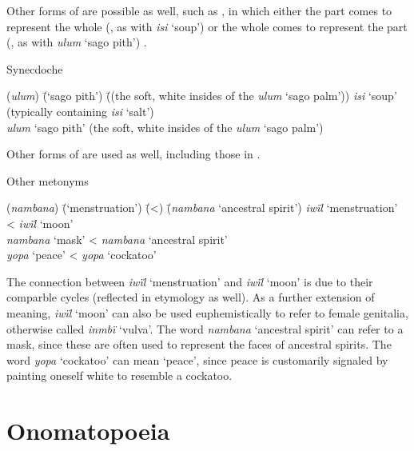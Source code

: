 Other forms of  are possible as well, such as , in which either the part comes to represent the whole (, as with \textit{isi} ‘soup’) or the whole comes to represent the part (, as with \textit{ulum} ‘sago pith’) .

\ea%
    \label{ex:sem:8}
            Synecdoche
\begin{tabbing}
{(\textit{ulum})} \= {(‘sago pith’)} \= {((the soft, white insides of the \textit{ulum} ‘sago palm’))}\kill
{\textit{isi}} \> {‘soup’} \> {(typically containing \textit{isi} ‘salt’)}\\
{\textit{ulum}} \> {‘sago pith’} \> {(the soft, white insides of the \textit{ulum} ‘sago palm’)}
\end{tabbing}
 \z

Other forms of  are used as well, including those in .

\ea%
    \label{ex:sem:9}
            Other metonyms
\begin{tabbing}
{(\textit{nambana})} \= {(‘menstruation’)} \= {(<)} \= {(\textit{nambana} {‘ancestral spirit’})}\kill
{\textit{iwïl}} \> {‘menstruation’} \> {<} \> {\textit{iwïl} ‘moon’}\\
{\textit{nambana}}\> {‘mask’} \> {<} \> {\textit{nambana} ‘ancestral spirit’}\\
{\textit{yopa}} \> {‘peace’} \> {<} \> {\textit{yopa} ‘cockatoo’}
 \end{tabbing}
\z

The connection between \textit{iwïl} ‘menstruation’ and \textit{iwïl} ‘moon’ is due to their comparble cycles (reflected in  etymology as well). As a further extension of meaning, \textit{iwïl} ‘moon’ can also be used euphemistically to refer to female genitalia, otherwise called \textit{inmbï} ‘vulva’. The word \textit{nambana} ‘ancestral spirit’ can refer to a mask, since these are often used to represent the faces of ancestral spirits. The word \textit{yopa} ‘cockatoo’ can mean ‘peace’, since peace is customarily signaled by painting oneself white to resemble a cockatoo.


\section{Onomatopoeia}\label{sec:14.3}


